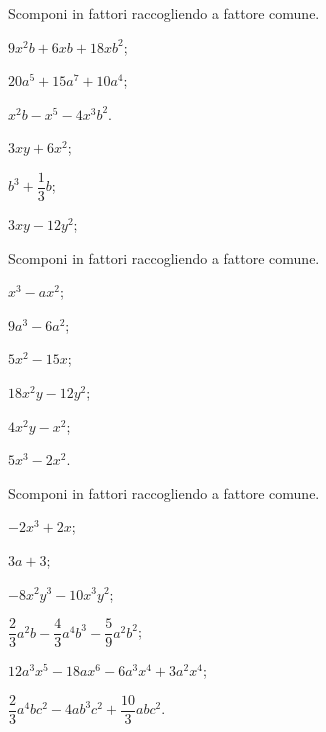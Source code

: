\begin{esercizio}[\Ast]
\label{ese:13.3}
Scomponi in fattori raccogliendo a fattore comune.
\begin{multicols}{3}
\begin{enumeratea}
 \item $9x^{2}b+6xb+18xb^{2}$;
 \item $20a^{5}+15a^{7}+10a^{4}$;
 \item $x^{2}b-x^{5}-4x^{3}b^{2}$.
 \item $3xy+6x^{2}$;
 \item $b^{3}+\dfrac{1}{3}b$;
 \item $3xy-12y^{2}$;
\end{enumeratea}
\end{multicols}
\end{esercizio}

\begin{esercizio}
\label{ese:13.4}
Scomponi in fattori raccogliendo a fattore comune.
\begin{multicols}{3}
\begin{enumeratea}
 \item $x^{3}-ax^{2}$;
 \item $9a^{3}-6a^{2}$;
 \item $5x^{2}-15x$;
 \item $18x^{2}y-12y^{2}$;
 \item $4x^{2}y-x^{2}$;
 \item $5x^{3}-2x^{2}$.
\end{enumeratea}
\end{multicols}
\end{esercizio}

\begin{esercizio}
\label{ese:13.5}
Scomponi in fattori raccogliendo a fattore comune.
\begin{multicols}{2}
\begin{enumeratea}
 \item $-2x^{3}+2x$;
 \item $3a+3$;
 \item $-8x^{2}y^{3}-10x^{3}y^{2}$;
 \item $\dfrac{2}{3}a^{2}b-\dfrac{4}{3}a^{4}b^{3}-\dfrac{5}{9}a^{2}b^{2}$;
 \item $12a^{3}x^{5}-18ax^{6}-6a^{3}x^{4}+3a^{2}x^{4}$;
 \item $\dfrac{2}{3}a^{4}bc^{2}-4ab^{3}c^{2}+\dfrac{10}{3}abc^{2}$.
\end{enumeratea}
\end{multicols}
\end{esercizio}

